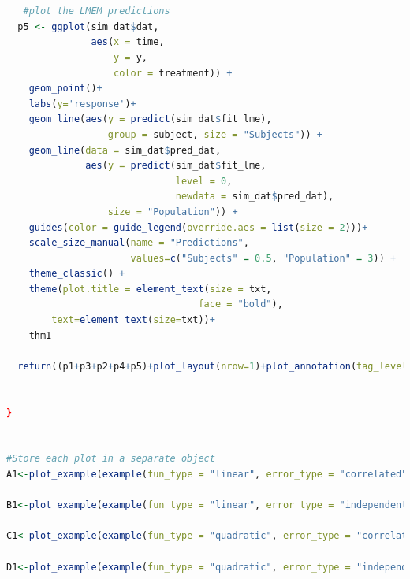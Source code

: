 \documentclass[
]{article}
\begin{document}
\begin{lstlisting}[language=R]
   
   
   #plot the LMEM predictions
  p5 <- ggplot(sim_dat$dat, 
               aes(x = time, 
                   y = y, 
                   color = treatment)) +
    geom_point()+
    labs(y='response')+
    geom_line(aes(y = predict(sim_dat$fit_lme), 
                  group = subject, size = "Subjects")) +
    geom_line(data = sim_dat$pred_dat, 
              aes(y = predict(sim_dat$fit_lme, 
                              level = 0, 
                              newdata = sim_dat$pred_dat), 
                  size = "Population")) +
    guides(color = guide_legend(override.aes = list(size = 2)))+
    scale_size_manual(name = "Predictions", 
                      values=c("Subjects" = 0.5, "Population" = 3)) +
    theme_classic() +
    theme(plot.title = element_text(size = txt, 
                                  face = "bold"),
        text=element_text(size=txt))+
    thm1
  
  return((p1+p3+p2+p4+p5)+plot_layout(nrow=1)+plot_annotation(tag_levels = 'A')) 
  
    
}


#Store each plot in a separate object
A1<-plot_example(example(fun_type = "linear", error_type = "correlated")) 

B1<-plot_example(example(fun_type = "linear", error_type = "independent")) 
  
C1<-plot_example(example(fun_type = "quadratic", error_type = "correlated")) 
  
D1<-plot_example(example(fun_type = "quadratic", error_type = "independent")) 
\end{lstlisting}
\end{document}
